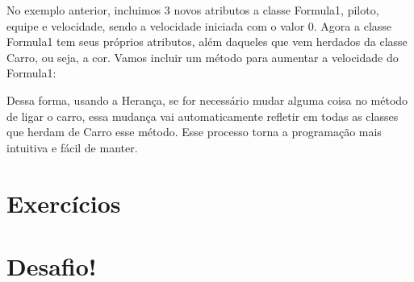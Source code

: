 

No exemplo anterior, incluimos 3 novos atributos a classe Formula1, piloto, equipe e velocidade, 
sendo a velocidade iniciada com o valor 0. Agora a classe Formula1 tem seus próprios atributos, 
além daqueles que vem herdados da classe Carro, ou seja, a cor. Vamos incluir um método para 
aumentar a velocidade do Formula1:



Dessa forma, usando a Herança, se for necessário mudar alguma coisa no método de ligar o carro, 
essa mudança vai automaticamente refletir em todas as classes que herdam de Carro esse método. 
Esse processo torna a programação mais intuitiva e fácil de manter. 


\section{Exercícios}
\label{cap11-exercicios}

\section{Desafio!}
\label{cap11-desafio}